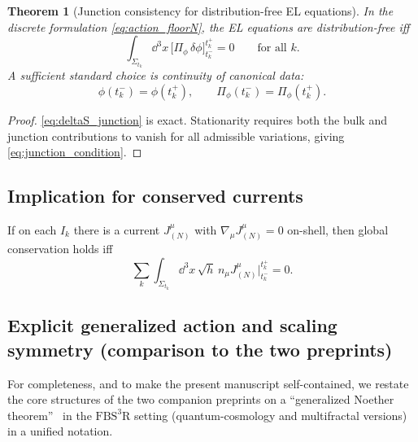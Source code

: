 \documentclass[
  reprint,
  amsmath,amssymb,
  aps,
  prd,
  superscriptaddress,
  nofootinbib,
  longbibliography
]{revtex4-2}
\newcommand{\Sig}{\Sigma}
\newtheorem{theorem}{Theorem}
\theoremstyle{definition}
\theoremstyle{remark}
\begin{document}
\begin{theorem}[Junction consistency for distribution-free EL equations]
\label{thm:junction_condition}
In the discrete formulation \eqref{eq:action_floorN}, the EL equations are distribution-free iff
\begin{equation}
\int_{\Sig_{t_k}}\dd^3x\, \Big[\Pi_\phi\,\delta\phi\Big]^{t_k^+}_{t_k^-}=0
\qquad \text{for all }k.
\label{eq:junction_condition}
\end{equation}
A sufficient standard choice is continuity of canonical data:
\begin{equation}
\phi(t_k^-)=\phi(t_k^+),\qquad \Pi_\phi(t_k^-)=\Pi_\phi(t_k^+).
\label{eq:canonical_continuity}
\end{equation}
\end{theorem}

\begin{proof}
\eqref{eq:deltaS_junction} is exact. Stationarity requires both the bulk and junction contributions to vanish for all
admissible variations, giving \eqref{eq:junction_condition}.
\end{proof}

\subsection{Implication for conserved currents}
If on each $I_k$ there is a current $J^\mu_{(N)}$ with $\nabla_\mu J^\mu_{(N)}=0$ on-shell, then global conservation
holds iff
\begin{equation}
\sum_k \int_{\Sig_{t_k}}\dd^3x\,\sqrt{h}\, n_\mu J^\mu_{(N)}\Big|^{t_k^+}_{t_k^-}=0.
\label{eq:current_junction_flux}
\end{equation}


\subsection{Explicit generalized action and scaling symmetry (comparison to the two preprints)}
\label{sec:explicit-generalized-noether}

For completeness, and to make the present manuscript self-contained, we restate the
core structures of the two companion preprints on a ``generalized Noether theorem''~\cite{PreeceBatenin2025QCNoether,PreeceBatenin2025MFNoether}
in the $\mathrm{FBS^3R}$ setting (quantum-cosmology and multifractal versions) in a unified notation.
\end{document}

